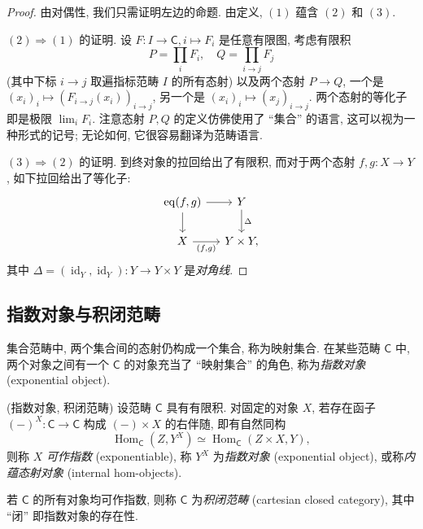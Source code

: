 \begin{proof}
    由对偶性, 我们只需证明左边的命题. 由定义, $(1)$ 蕴含 $(2)$ 和 $(3)$.
    
    $(2) \Rightarrow (1)$ 的证明. 设 $F \colon I \to\mathsf C, i\mapsto F_i$ 是任意有限图,
    考虑有限积
    $$
        P = \prod_{i} F_i,\quad
        Q = \prod_{i \to j} F_j
    $$
    (其中下标 $i\to j$ 取遍指标范畴 $I$ 的所有态射) 以及两个态射 $P \to Q$,
    一个是
    $(x_i)_{i} \mapsto (F_{i\to j}(x_i))_{i\to j}$,
    另一个是
    $(x_i)_{i} \mapsto (x_j)_{i\to j}$.
    两个态射的等化子即是极限 $\lim_{i} F_i$.
    注意态射 $P,Q$ 的定义仿佛使用了 ``集合'' 的语言,
    这可以视为一种形式的记号; 无论如何, 它很容易翻译为范畴语言.

    $(3) \Rightarrow (2)$ 的证明.
    到终对象的拉回给出了有限积,
    而对于两个态射 $f,g \colon X \to Y$, 如下拉回给出了等化子:
    \[\begin{tikzcd}[ampersand replacement=\&,column sep=small]
    	{\operatorname{eq}(f,g)} \& Y \\
    	X \& Y\times Y,
    	\arrow["\Delta", from=1-2, to=2-2]
    	\arrow["{(f,g)}"', from=2-1, to=2-2]
    	\arrow[from=1-1, to=2-1]
    	\arrow[from=1-1, to=1-2]
    \end{tikzcd}\]
    其中 $\Delta = (\operatorname{id}_Y,\operatorname{id}_Y) \colon Y\to Y\times Y$ 是\emph{对角线}.
\end{proof}

\subsection{指数对象与积闭范畴}

集合范畴中, 两个集合间的态射仍构成一个集合, 称为映射集合. 在某些范畴 $\mathsf C$ 中, 两个对象之间有一个 $\mathsf C$ 的对象充当了 ``映射集合'' 的角色, 称为\emph{指数对象} (exponential object).

\begin{definition}
    [label={exponential-object}]
    {(指数对象, 积闭范畴)}
    设范畴 $\mathsf C$ 具有有限积. 对固定的对象 $X$, 若存在函子 $(-)^X \colon \mathsf C \to \mathsf C$ 构成 $(-)\times X$ 的右伴随\footnotemark, 即有自然同构
    \begin{equation}
        \operatorname{Hom}_{\mathsf C}(Z,Y^X)  \simeq \operatorname{Hom}_{\mathsf C}(Z\times X,Y),
        \label{exponential-adjoint}
    \end{equation}
    则称 $X$ \emph{可作指数} (exponentiable), 称 $Y^X$ 为\emph{指数对象} (exponential object), 或称\emph{内蕴态射对象} (internal hom-objects).
    
    若 $\mathsf C$ 的所有对象均可作指数, 则称 $\mathsf C$ 为\emph{积闭范畴} (cartesian closed category), 其中 ``闭'' 即指数对象的存在性.
\end{definition}

